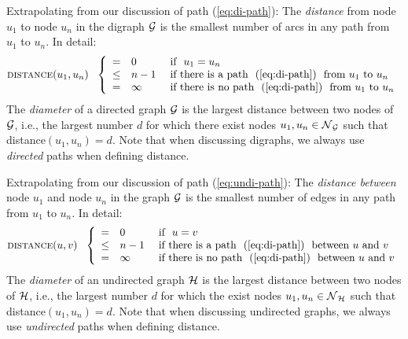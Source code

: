 Extrapolating from our discussion of path (\ref{eq:di-path}): The {\it
  distance} from node $u_1$ to node $u_n$ in the digraph $\mbox{$\cal G$}$ is the
smallest number of arcs in any path from $u_1$ to $u_n$.  In detail:
\begin{equation}
\label{eq:di-distance-defn}
 \mbox{\sc distance}(u_1, u_n) \ \ \left\{
\begin{array}{cll}
= & 0 & \mbox{  if  } \ u_1 = u_n \\
\leq & n-1 & \mbox{  if there is a path } \ (\ref{eq:di-path})
\ \mbox{ from $u_1$ to $u_n$} \\
= & \infty & \mbox{  if there is no path } \ (\ref{eq:di-path})
\ \mbox{ from $u_1$ to $u_n$}
\end{array}
\right.
\end{equation}
The {\it diameter} 
 of a directed graph $\mbox{$\cal G$}$ is the largest
distance between two nodes of $\mbox{$\cal G$}$, i.e., the largest number $d$ for
which there exist nodes $u_1, u_n \in \mbox{$\cal N$}_{\mbox{{\scriptsize $\cal G$}}}$ such that {\sc
  distance}$(u_1, u_n) = d$.  Note that when discussing digraphs, we
always use {\em directed} paths when defining distance.

\medskip

Extrapolating from our discussion of path (\ref{eq:undi-path}): The
{\it distance between} node $u_1$ and node $u_n$ in the graph $\mbox{$\cal G$}$ is
the smallest number of edges in any path from $u_1$ to $u_n$.  In
detail:
\begin{equation}
\label{eq:distance-defn}
 \mbox{\sc distance}(u, v) \ \ \left\{
\begin{array}{cll}
= & 0 & \mbox{  if  } \ u = v \\
\leq & n-1 & \mbox{  if there is a path } \ (\ref{eq:di-path})
\ \mbox{ between $u$ and $v$} \\
= & \infty & \mbox{  if there is no path } \ (\ref{eq:di-path})
\ \mbox{ between $u$ and $v$}
\end{array}
\right.
\end{equation}
The {\it diameter}  
of an undirected graph $\mbox{$\cal H$}$ is the largest distance between two nodes
of $\mbox{$\cal H$}$, i.e., the largest number $d$ for which the exist nodes $u_1,
u_n \in \mbox{$\cal N$}_{\mbox{{\scriptsize $\cal H$}}}$ such that {\sc distance}$(u_1, u_n) = d$.  Note that
when discussing undirected graphs, we always use {\em undirected}
paths when defining distance.

